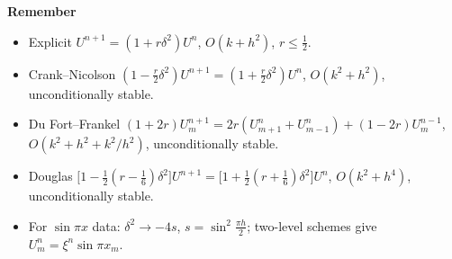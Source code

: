\documentclass[11pt,a4paper]{article}
\newenvironment{rem}
  {\begin{remember}\noindent\textbf{Remember}\par\nobreak\vspace{-0.3em}}
  {\end{remember}}
\begin{document}
\begin{rem}
\begin{itemize}
  \item Explicit \(U^{n+1}=(1+r\delta^2)U^n\), \(O(k+h^2)\), \(r\le\frac12\).
  \item Crank--Nicolson
    \((1-\frac r2\delta^2)U^{n+1}=(1+\frac r2\delta^2)U^n\), \(O(k^2+h^2)\),
    unconditionally stable.
  \item Du Fort--Frankel
    \((1+2r)U_m^{n+1}=2r(U_{m+1}^n+U_{m-1}^n)+(1-2r)U_m^{n-1}\),
    \(O(k^2+h^2+k^2/h^2)\), unconditionally stable.
  \item Douglas
    \(\bigl[1-\frac12(r-\frac16)\delta^2\bigr]U^{n+1}=\bigl[1+\frac12(r+\frac16)\delta^2\bigr]U^n\),
    \(O(k^2+h^4)\), unconditionally stable.
  \item For \(\sin\pi x\) data: \(\delta^2\to-4s\), \(s=\sin^2\frac{\pi h}2\);
    two-level schemes give \(U_m^n=\xi^n\sin\pi x_m\).
\end{itemize}
\end{rem}
\end{document}
